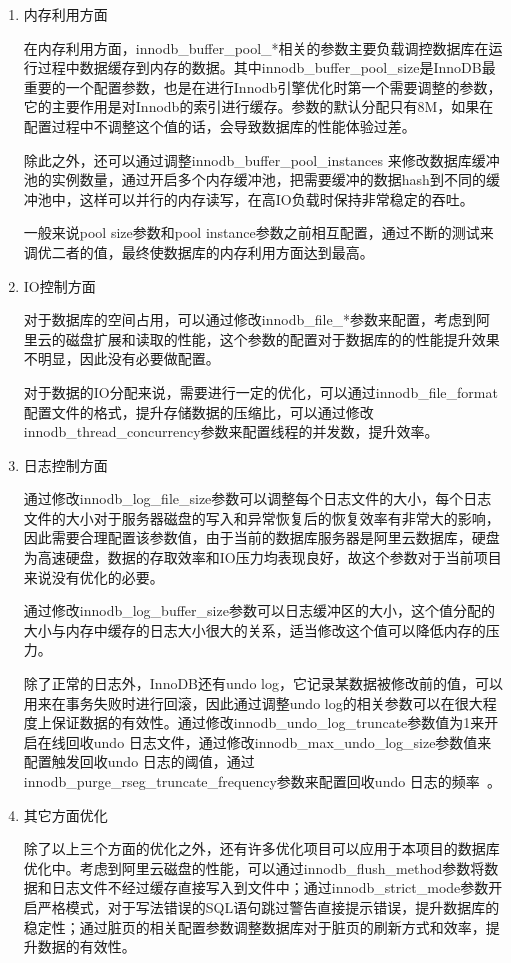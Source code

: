 \begin{enumerate}
\item 内存利用方面

在内存利用方面，innodb\_buffer\_pool\_*相关的参数主要负载调控数据库在运行过程中数据缓存到内存的数据。其中innodb\_buffer\_pool\_size是InnoDB最重要的一个配置参数，也是在进行Innodb引擎优化时第一个需要调整的参数，它的主要作用是对Innodb的索引进行缓存。参数的默认分配只有8M，如果在配置过程中不调整这个值的话，会导致数据库的性能体验过差。

除此之外，还可以通过调整innodb\_buffer\_pool\_instances 来修改数据库缓冲池的实例数量，通过开启多个内存缓冲池，把需要缓冲的数据hash到不同的缓冲池中，这样可以并行的内存读写，在高IO负载时保持非常稳定的吞吐。

一般来说pool size参数和pool instance参数之前相互配置，通过不断的测试来调优二者的值，最终使数据库的内存利用方面达到最高。
\item IO控制方面

对于数据库的空间占用，可以通过修改innodb\_file\_*参数来配置，考虑到阿里云的磁盘扩展和读取的性能，这个参数的配置对于数据库的的性能提升效果不明显，因此没有必要做配置。

对于数据的IO分配来说，需要进行一定的优化，可以通过innodb\_file\_format配置文件的格式，提升存储数据的压缩比，可以通过修改innodb\_thread\_concurrency参数来配置线程的并发数，提升效率。
\item 日志控制方面

通过修改innodb\_log\_file\_size参数可以调整每个日志文件的大小，每个日志文件的大小对于服务器磁盘的写入和异常恢复后的恢复效率有非常大的影响，因此需要合理配置该参数值，由于当前的数据库服务器是阿里云数据库，硬盘为高速硬盘，数据的存取效率和IO压力均表现良好，故这个参数对于当前项目来说没有优化的必要。

通过修改innodb\_log\_buffer\_size参数可以日志缓冲区的大小，这个值分配的大小与内存中缓存的日志大小很大的关系，适当修改这个值可以降低内存的压力。

除了正常的日志外，InnoDB还有undo log，它记录某数据被修改前的值，可以用来在事务失败时进行回滚，因此通过调整undo log的相关参数可以在很大程度上保证数据的有效性。通过修改innodb\_undo\_log\_truncate参数值为1来开启在线回收undo 日志文件，通过修改innodb\_max\_undo\_log\_size参数值来配置触发回收undo 日志的阈值，通过innodb\_purge\_rseg\_truncate\_frequency参数来配置回收undo 日志的频率~\cite{fruhwirt2010innodb}。
\item 其它方面优化

除了以上三个方面的优化之外，还有许多优化项目可以应用于本项目的数据库优化中。考虑到阿里云磁盘的性能，可以通过innodb\_flush\_method参数将数据和日志文件不经过缓存直接写入到文件中；通过innodb\_strict\_mode参数开启严格模式，对于写法错误的SQL语句跳过警告直接提示错误，提升数据库的稳定性；通过脏页的相关配置参数调整数据库对于脏页的刷新方式和效率，提升数据的有效性。
\end{enumerate}
